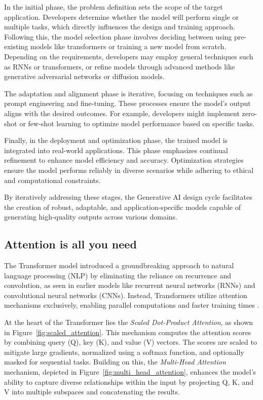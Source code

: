 In the initial phase, the problem definition sets the scope of the target application. Developers determine whether the model will perform single or multiple tasks, which directly influences the design and training approach. Following this, the model selection phase involves deciding between using pre-existing models like transformers or training a new model from scratch. Depending on the requirements, developers may employ general techniques such as RNNs or transformers, or refine models through advanced methods like generative adversarial networks or diffusion models.

The adaptation and alignment phase is iterative, focusing on techniques such as prompt engineering and fine-tuning. These processes ensure the model's output aligns with the desired outcomes. For example, developers might implement zero-shot or few-shot learning to optimize model performance based on specific tasks.

Finally, in the deployment and optimization phase, the trained model is integrated into real-world applications. This phase emphasizes continual refinement to enhance model efficiency and accuracy. Optimization strategies ensure the model performs reliably in diverse scenarios while adhering to ethical and computational constraints.

By iteratively addressing these stages, the Generative AI design cycle facilitates the creation of robust, adaptable, and application-specific models capable of generating high-quality outputs across various domains.
\subsection{Attention is all you need}
The Transformer model introduced a groundbreaking approach to natural language processing (NLP) by eliminating the reliance on recurrence and convolution, as seen in earlier models like recurrent neural networks (RNNs) and convolutional neural networks (CNNs). Instead, Transformers utilize attention mechanisms exclusively, enabling parallel computations and faster training times \cite{vaswani2017attention}.

At the heart of the Transformer lies the \textit{Scaled Dot-Product Attention}, as shown in Figure~\ref{fig:scaled_attention}. This mechanism computes the attention scores by combining query (Q), key (K), and value (V) vectors. The scores are scaled to mitigate large gradients, normalized using a softmax function, and optionally masked for sequential tasks. Building on this, the \textit{Multi-Head Attention} mechanism, depicted in Figure~\ref{fig:multi_head_attention}, enhances the model's ability to capture diverse relationships within the input by projecting Q, K, and V into multiple subspaces and concatenating the results.


